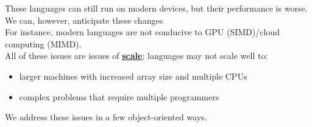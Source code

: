 \documentclass[../../lecture_notes.tex]{subfiles}
\begin{document}
These languages can still run on modern devices, but their performance is worse.\\
We can, however, anticipate these changes\\
\indent For instance, modern languages are not conducive to GPU (SIMD)/cloud computing (MIMD).\\
All of these issues are issues of \textbf{\underline{scale}}; languages may not scale well to:
	\begin{itemize} [itemsep=0mm]
		\item larger machines with increased array size and multiple CPUs
		\item complex problems that require multiple programmers
	\end{itemize}
We address these issues in a few object-oriented ways.
\end{document}
